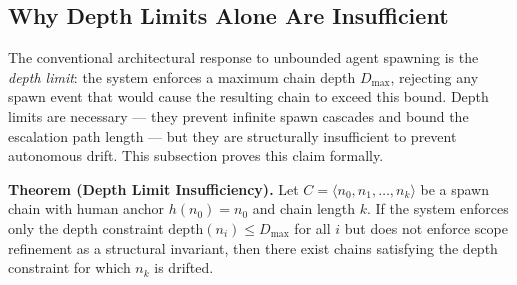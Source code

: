 \subsection{Why Depth Limits Alone Are Insufficient}

The conventional architectural response to unbounded agent spawning is the \emph{depth limit}: the system enforces a maximum chain depth $D_{\max}$, rejecting any spawn event that would cause the resulting chain to exceed this bound. Depth limits are necessary — they prevent infinite spawn cascades and bound the escalation path length — but they are structurally insufficient to prevent autonomous drift. This subsection proves this claim formally.

\medskip
\noindent\textbf{Theorem (Depth Limit Insufficiency).} Let $C = \langle n_0, n_1, \ldots, n_k \rangle$ be a spawn chain with human anchor $h(n_0) = n_0$ and chain length $k$. If the system enforces only the depth constraint $\text{depth}(n_i) \leq D_{\max}$ for all $i$ but does not enforce scope refinement as a structural invariant, then there exist chains satisfying the depth constraint for which $n_k$ is drifted.

